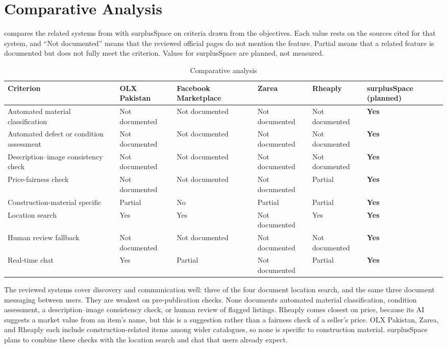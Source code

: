 \section{Comparative Analysis}
 compares the related systems from 
with surplusSpace on criteria drawn from the objectives. Each value rests on the sources
cited for that system, and ``Not documented'' means that the reviewed official pages do not
mention the feature. Partial means that a related feature is documented but does not
fully meet the criterion. Values for surplusSpace are planned, not measured.

\begin{table}[H]
\centering
\caption{Comparative analysis}
\label{tab:comparative-analysis}
\footnotesize
\begin{tabularx}{\textwidth}{@{}p{}XXXXX@{}}
\toprule
\textbf{Criterion} & \textbf{OLX Pakistan}~\citep{olxpakistan,olxchathelp} & \textbf{Facebook Marketplace}~\citep{facebookmarketplace,facebookmarketplacehelp} & \textbf{Zarea}~\citep{zareapk,zareaabout,zareaai} & \textbf{Rheaply} \citep{rheaplyfeatures,rheaplytrust} & \textbf{surplus\-Space (planned)} \\
\midrule
Automated material classification & Not documented & Not documented & Not documented & Not documented & \textbf{Yes} \\
Automated defect or condition assessment & Not documented & Not documented & Not documented & Not documented & \textbf{Yes} \\
Description--image consistency check & Not documented & Not documented & Not documented & Not documented & \textbf{Yes} \\
Price-fairness check & Not documented & Not documented & Not documented & Partial & \textbf{Yes} \\
Construction-material specific & Partial & No & Partial & Partial & \textbf{Yes} \\
Location search & Yes & Yes & Not documented & Yes & \textbf{Yes} \\
Human review fallback & Not documented & Not documented & Not documented & Not documented & \textbf{Yes} \\
Real-time chat & Yes & Partial & Not documented & Partial & \textbf{Yes} \\
\bottomrule
\end{tabularx}
\end{table}

The reviewed systems cover discovery and communication well: three of the four document
location search, and the same three document messaging between users. They are weakest on
pre-publication checks. None documents automated material classification, condition
assessment, a description--image consistency check, or human review of flagged listings.
Rheaply comes closest on price, because its AI suggests a market value from an item's
name, but this is a suggestion rather than a fairness check of a seller's price. OLX
Pakistan, Zarea, and Rheaply each include construction-related items among wider catalogues,
so none is specific to construction material. surplusSpace plans to combine these
checks with the location search and chat that users already expect.

